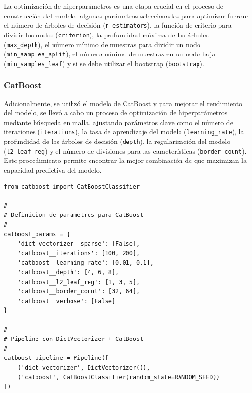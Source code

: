 \documentclass[11pt,a4paper,spanish]{book}
\numberwithin{equation}{chapter}
\numberwithin{figure}{chapter}
\begin{document}
La optimización de hiperparámetros es una etapa crucial en el proceso de construcción del modelo. algunos parámetros seleccionados para optimizar fueron: el número de árboles de decisión (\lstinline|n_estimators|), la función de criterio para dividir los nodos (\lstinline|criterion|), la profundidad máxima de los árboles (\lstinline|max_depth|), el número mínimo de muestras para dividir un nodo (\lstinline|min_samples_split|), el número mínimo de muestras en un nodo hoja (\lstinline|min_samples_leaf|) y si se debe utilizar el bootstrap (\lstinline|bootstrap|). 


\subsubsection{CatBoost}

Adicionalmente, se utilizó el modelo de CatBoost y para mejorar el rendimiento del modelo, se llevó a cabo un proceso de optimización de hiperparámetros mediante búsqueda en malla, ajustando parámetros clave como el número de iteraciones (\lstinline|iterations|), la tasa de aprendizaje del modelo (\lstinline|learning_rate|), la profundidad de los árboles de decisión (\lstinline|depth|), la regularización del modelo (\lstinline|l2_leaf_reg|) y el número de divisiones para las características (\lstinline|border_count|). Este procedimiento permite encontrar la mejor combinación de que maximizan la capacidad predictiva del modelo.


\vspace{5mm}
\begin{lstlisting}
from catboost import CatBoostClassifier

# -------------------------------------------------------------------
# Definicion de parametros para CatBoost
# -------------------------------------------------------------------
catboost_params = {
    'dict_vectorizer__sparse': [False],
    'catboost__iterations': [100, 200],
    'catboost__learning_rate': [0.01, 0.1],
    'catboost__depth': [4, 6, 8],
    'catboost__l2_leaf_reg': [1, 3, 5],
    'catboost__border_count': [32, 64],
    'catboost__verbose': [False]
}

# -------------------------------------------------------------------
# Pipeline con DictVectorizer + CatBoost
# -------------------------------------------------------------------
catboost_pipeline = Pipeline([
    ('dict_vectorizer', DictVectorizer()),
    ('catboost', CatBoostClassifier(random_state=RANDOM_SEED))
])
\end{lstlisting}
\end{document}
